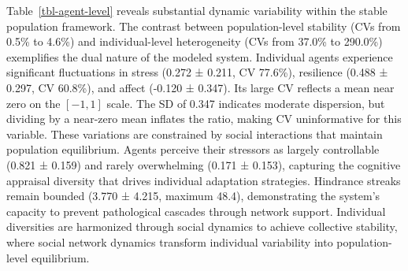 \documentclass[
  letterpaper,
  DIV=11,
  numbers=noendperiod]{scrartcl}
\begin{document}
\begin{table}

\caption{\label{tbl-agent-level}Agent-level temporal dynamics
demonstrating individual heterogeneity within population stability}


\end{table}%

Table~\ref{tbl-agent-level} reveals substantial dynamic variability
within the stable population framework. The contrast between
population-level stability (CVs from 0.5\% to 4.6\%) and
individual-level heterogeneity (CVs from 37.0\% to 290.0\%) exemplifies
the dual nature of the modeled system. Individual agents experience
significant fluctuations in stress (0.272 ± 0.211, CV 77.6\%),
resilience (0.488 ± 0.297, CV 60.8\%), and affect (-0.120 ± 0.347). Its
large CV reflects a mean near zero on the \([-1, 1]\) scale. The SD of
0.347 indicates moderate dispersion, but dividing by a near-zero mean
inflates the ratio, making CV uninformative for this variable. These
variations are constrained by social interactions that maintain
population equilibrium. Agents perceive their stressors as largely
controllable (0.821 ± 0.159) and rarely overwhelming (0.171 ± 0.153),
capturing the cognitive appraisal diversity that drives individual
adaptation strategies. Hindrance streaks remain bounded (3.770 ± 4.215,
maximum 48.4), demonstrating the system's capacity to prevent
pathological cascades through network support. Individual diversities
are harmonized through social dynamics to achieve collective stability,
where social network dynamics transform individual variability into
population-level equilibrium.
\end{document}

